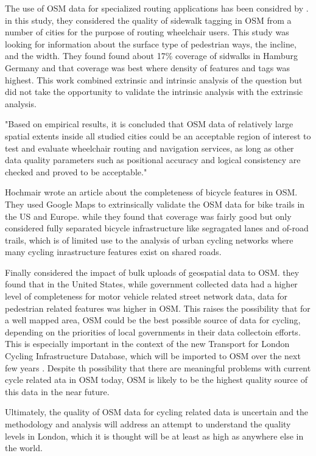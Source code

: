 The use of OSM data for specialized routing applications has been considred by  \cite{mobasheri2017crowdsourced}. in this study, they considered the quality of sidewalk tagging in OSM from a number of cities for the purpose of routing wheelchair users. This study was looking for information about the surface type of pedestrian ways, the incline, and the width. They found found about 17\% coverage of sidwalks in Hamburg Germany and that coverage was best where density of features and tags was highest. This work combined extrinsic and intrinsic analysis of the question but did not take the opportunity to validate the intrinsic analysis with the extrinsic analysis. 

"Based on empirical results, it is concluded that OSM data of relatively large spatial extents inside all studied cities could be an acceptable region of interest to test and evaluate wheelchair routing and navigation services, as long as other data quality parameters such as positional accuracy and logical consistency are checked and proved to be acceptable."  

Hochmair wrote an article about the completeness of bicycle features in OSM. They used Google Maps to extrinsically validate the OSM data for bike trails in the US and Europe. while they found that coverage was fairly good but only considered fully separated bicycle infrastructure like segragated lanes and of-road trails, which is of limited use to the analysis of urban cycling networks where many cycling inrastructure features exist on shared roads. 

Finally \cite{zielstra2013assessing} considered the impact of bulk uploads of geospatial data to OSM. they found that in the United States, while government collected data had a higher level of completeness for motor vehicle related street network data, data for pedestrian related features was higher in OSM. This raises the possibility that for a well mapped area, OSM could be the best possible source of data for cycling, depending on the priorities of local governments in their data collectoin efforts. This is especially important in the context of the new Transport for London Cycling Infrastructure Database, which will be imported to OSM over the next few years \cite{tflcid}. Despite th possibility that there are meaningful problems with current cycle related ata in OSM today, OSM is likely to be the highest quality source of this data in the near future. 

Ultimately, the quality of OSM data for cycling related data is uncertain and the methodology and analysis will address an attempt to understand the quality levels in London, which it is thought will be at least as high as anywhere else in the world. 
